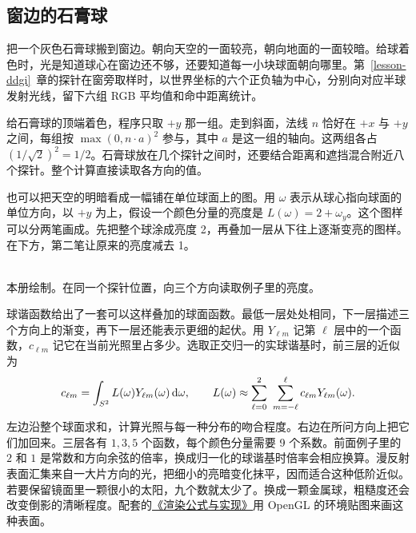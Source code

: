 \clearpage
\subsection*{窗边的石膏球}

把一个灰色石膏球搬到窗边。朝向天空的一面较亮，朝向地面的一面较暗。给球着色时，光是知道球心在窗边还不够，还要知道每一小块球面朝向哪里。第~\ref{lesson-ddgi}~章的探针在窗旁取样时，以世界坐标的六个正负轴为中心，分别向对应半球发射光线，留下六组 RGB 平均值和命中距离统计。

给石膏球的顶端着色，程序只取 $+y$ 那一组。走到斜面，法线 $n$ 恰好在 $+x$ 与 $+y$ 之间，每组按 $\max(0,n\cdot a)^2$ 参与，其中 $a$ 是这一组的轴向。这两组各占 $(1/\sqrt2)^2=1/2$。石膏球放在几个探针之间时，还要结合距离和遮挡混合附近八个探针。整个计算直接读取各方向的值。

也可以把天空的明暗看成一幅铺在单位球面上的图。用 $\omega$ 表示从球心指向球面的单位方向，以 $+y$ 为上，假设一个颜色分量的亮度是 $L(\omega)=2+\omega_y$。这个图样可以分两笔画成。先把整个球涂成亮度 2，再叠加一层从下往上逐渐变亮的图样。在下方，第二笔让原来的亮度减去 1。

\begin{center}
\\
{\small 本册绘制。在同一个探针位置，向三个方向读取例子里的亮度。}
\end{center}

球谐函数给出了一套可以这样叠加的球面函数。最低一层处处相同，下一层描述三个方向上的渐变，再下一层还能表示更细的起伏。用 $Y_{\ell m}$ 记第 $\ell$ 层中的一个函数，$c_{\ell m}$ 记它在当前光照里占多少。选取正交归一的实球谐基时，前三层的近似为
\[
 c_{\ell m}=\int_{S^2}L(\omega)Y_{\ell m}(\omega)\,{\rm d}\omega ,
 \qquad
 L(\omega)\approx\sum_{\ell=0}^{2}\ \sum_{m=-\ell}^{\ell} c_{\ell m}Y_{\ell m}(\omega).
\]
左边沿整个球面求和，计算光照与每一种分布的吻合程度。右边在所问方向上把它们加回来。三层各有 $1,3,5$ 个函数，每个颜色分量需要 9 个系数。前面例子里的 $2$ 和 $1$ 是常数和方向余弦的倍率，换成归一化的球谐基时倍率会相应换算。漫反射表面汇集来自一大片方向的光，把细小的亮暗变化抹平，因而适合这种低阶近似。若要保留镜面里一颗很小的太阳，九个数就太少了。换成一颗金属球，粗糙度还会改变倒影的清晰程度。配套的\href{run:Redflag-Rendering-Math.pdf}{《渲染公式与实现》}用 OpenGL 的环境贴图来画这种表面。

